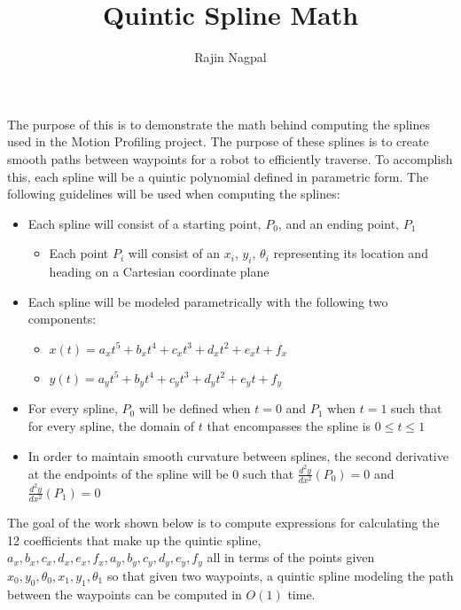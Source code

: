 \documentclass[12pt, letterpaper]{article}
\title{Quintic Spline Math}
\author{Rajin Nagpal}
\begin{document}
\maketitle

The purpose of this is to demonstrate the math behind computing the splines used in the Motion Profiling project. The purpose of these splines is to create smooth paths between waypoints for a robot to efficiently traverse. To accomplish this, each spline will be a quintic polynomial defined in parametric form. The following guidelines will be used when computing the splines: \begin{itemize}
\item Each spline will consist of a starting point, $P_0$, and an ending point, $P_1$ \begin{itemize}
\item Each point $P_i$ will consist of an $x_i$, $y_i$, $\theta_i$ representing its location and heading on a Cartesian coordinate plane
\end{itemize}
\item Each spline will be modeled parametrically with the following two components: \begin{itemize}
\item $x(t) = a_x t^5 + b_x t^4 + c_x t^3 + d_x t^2 + e_x t + f_x$
\item $y(t) = a_y t^5 + b_y t^4 + c_y t^3 + d_y t^2 + e_y t + f_y$
\end{itemize}
\item For every spline, $P_0$ will be defined when $t = 0$ and $P_1$ when $t = 1$ such that for every spline, the domain of $t$ that encompasses the spline is $0 \leq t \leq 1$
\item In order to maintain smooth curvature between splines, the second derivative at the endpoints of the spline will be $0$ such that $\frac{d^2y}{dx^2} (P_0) = 0$ and $\frac{d^2y}{dx^2} (P_1) = 0$
\end{itemize}

The goal of the work shown below is to compute expressions for calculating the 12 coefficients that make up the quintic spline, $a_x, b_x, c_x, d_x, e_x, f_x, a_y, b_y, c_y, d_y, e_y, f_y$ all in terms of the points given $x_0, y_0, \theta_0, x_1, y_1, \theta_1$ so that given two waypoints, a quintic spline modeling the path between the waypoints can be computed in $O(1)$ time.
\end{document}
